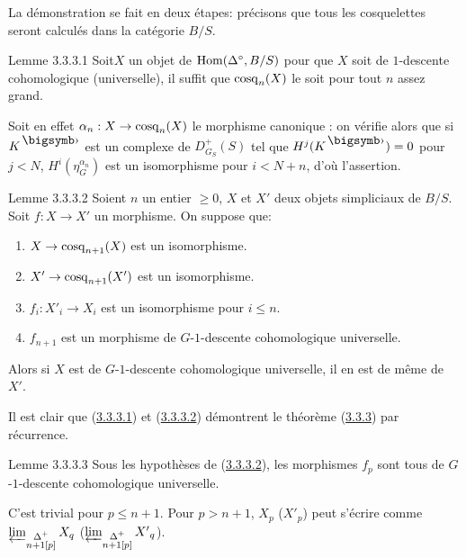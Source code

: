 \documentclass[10pt]{../fichiers-configuration-latex/smfart}
\begin{document}
La démonstration se fait en deux étapes: précisons que tous les
cosquelettes seront calculés dans la catégorie $B/S$.

\begin{enonce*}{Lemme 3.3.3.1}
Soit\pageoriginale $X$ un objet de $\operatorname{Hom}(\Delta^{\circ}, B/S)$ pour
que $X$ soit de $1$-descente cohomologique (\resp universelle), il suffit que
$\operatorname{cosq}_n (X)$ le soit pour tout $n$ assez grand.
\end{enonce*}

Soit en effet $\alpha_n : X \to \cosk_n(X)$ le morphisme canonique :
on vérifie alors que si $K^{\bigdot}$ est un complexe de $D^+_{G_S}(S)$
tel que $H^j (K^{\bigdot}) = 0$ pour $j < N$, $H^i(\eta_G^{\alpha_n})$
est un isomorphisme pour $i < N + n$, d'où l'assertion.

\begin{enonce*}{Lemme 3.3.3.2}
Soient $n$ un entier $ \geq 0$, $X$ et $X'$ deux objets simpliciaux de
$B/S$. Soit $f : X \to X'$ un morphisme. On suppose que:
\begin{enumerate}
\renewcommand{\theenumi}{\roman {enumi}}
\renewcommand{\labelenumi}{(\theenumi)}
\item $X \to \cosk_{n+1} (X)$ est un isomorphisme.

\item $X' \to \cosk_{n+1} (X')$ est un isomorphisme.

\item $f_i : X'_i \to X_i$ est un isomorphisme pour $i \leq n$.

\item $f_{n+1}$ est un morphisme de $G$-$1$-descente cohomologique
  universelle.
\end{enumerate}
Alors si $X$ est de $G$-$1$-descente cohomologique universelle, il en
est de même de $X'$.
\end{enonce*}

Il est clair que (\hyperref[Vbis.lem3.3.3.1]{3.3.3.1}) et (\hyperref[Vbis.lem3.3.3.2]{3.3.3.2})
démontrent le théorème (\hyperref[Vbis.thm3.3.3]{3.3.3}) par récurrence.

\begin{enonce*}{Lemme 3.3.3.3}
Sous les hypothèses de (\hyperref[Vbis.lem3.3.3.2]{3.3.3.2}), les morphismes $f_p$
sont tous de $G$-$1$-descente cohomologique universelle.
\end{enonce*}

C'est trivial pour $p \leq n+1$. Pour $p > n+1$, $X_p$ (\resp $X'_p$)
peut s'écrire comme
$\varprojlim_{\substack{\Delta^+\\ n+1[p]}} X_q$
(\resp $\varprojlim_{\substack{\Delta^+\\ n+1[p]}}
{X'}_q$).
\end{document}

